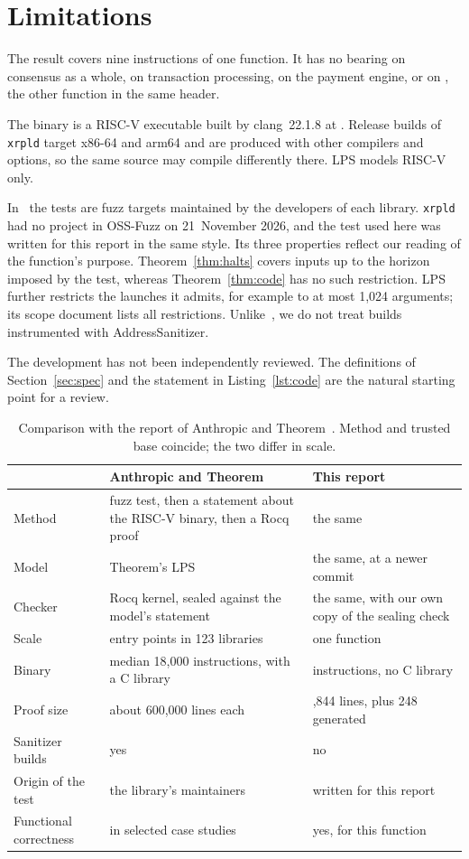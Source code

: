 \documentclass[11pt,a4paper]{article}
\newcommand{\code}[1]{\texttt{\upshape\detokenize{#1}}}
\theoremstyle{definition}
\begin{document}
\section{Limitations}
\label{sec:limits}

The result covers nine instructions of one function. It has no bearing on
consensus as a whole, on transaction processing, on the payment engine, or
on \code{getNextLedgerTimeResolution}, the other function in the same
header.

The binary is a RISC-V executable built by clang~22.1.8 at \code{-Os}.
Release builds of \texttt{xrpld} target x86-64 and arm64 and are produced
with other compilers and options, so the same source may compile differently
there. LPS models RISC-V only.

In~\cite{anthropic} the tests are fuzz targets maintained by the developers
of each library. \texttt{xrpld} had no project in OSS-Fuzz on 21~November
2026, and the test used here was written for this report in the same style.
Its three properties reflect our reading of the function's purpose.
Theorem~\ref{thm:halts} covers inputs up to the horizon imposed by the test,
whereas Theorem~\ref{thm:code} has no such restriction. LPS further
restricts the launches it admits, for example to at most 1,024 arguments;
its scope document lists all restrictions. Unlike~\cite{anthropic}, we do
not treat builds instrumented with AddressSanitizer.

The development has not been independently reviewed. The definitions of
Section~\ref{sec:spec} and the statement in Listing~\ref{lst:code} are the
natural starting point for a review.

\begin{table}[t]
\centering
\small
\begin{tabularx}{\textwidth}{@{}l>{\raggedright\arraybackslash}X>{\raggedright\arraybackslash}X@{}}
\toprule
 & Anthropic and Theorem~\cite{anthropic} & This report \\
\midrule
Method & fuzz test, then a statement about the RISC-V binary, then a Rocq proof & the same \\
Model & Theorem's LPS & the same, at a newer commit \\
Checker & Rocq kernel, sealed against the model's statement & the same, with our own copy of the sealing check \\
Scale & 239 entry points in 123 libraries & one function \\
Binary & median 18,000 instructions, with a C library & 87 instructions, no C library \\
Proof size & about 600,000 lines each & 1,844 lines, plus 248 generated \\
Sanitizer builds & yes & no \\
Origin of the test & the library's maintainers & written for this report \\
Functional correctness & in selected case studies & yes, for this function \\
\bottomrule
\end{tabularx}
\caption{Comparison with the report of Anthropic and
Theorem~\cite{anthropic}. Method and trusted base coincide; the two differ
in scale.}
\label{tab:compare}
\end{table}
\end{document}
